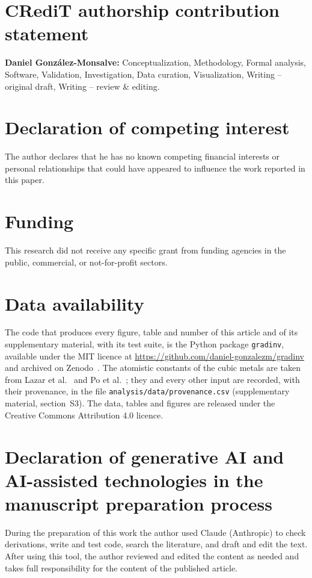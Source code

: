 
\section*{CRediT authorship contribution statement}

\textbf{Daniel Gonz\'alez-Monsalve:} Conceptualization, Methodology, Formal analysis,
Software, Validation, Investigation, Data curation, Visualization, Writing -- original draft,
Writing -- review \& editing.

\section*{Declaration of competing interest}

The author declares that he has no known competing financial interests or personal
relationships that could have appeared to influence the work reported in this paper.

\section*{Funding}

This research did not receive any specific grant from funding agencies in the public,
commercial, or not-for-profit sectors.

\section*{Data availability}

The code that produces every figure, table and number of this article and of its
supplementary material, with its test suite, is the Python package \texttt{gradinv},
available under the MIT licence at \url{https://github.com/daniel-gonzalezm/gradinv} and
archived on Zenodo~\cite{GonzalezMonsalve2026gradinv}. The atomistic constants of the cubic
metals are taken from Lazar et al.~\cite{Lazar2022} and Po et al.~\cite{Po2019}; they and
every other input are recorded, with their provenance, in the file
\texttt{analysis/data/provenance.csv} (supplementary material, section~S3). The data,
tables and figures are released under the Creative Commons Attribution 4.0 licence.

\section*{Declaration of generative AI and AI-assisted technologies in the manuscript preparation process}

During the preparation of this work the author used Claude (Anthropic) to check
derivations, write and test code, search the literature, and draft and edit the text. After
using this tool, the author reviewed and edited the content as needed and takes full
responsibility for the content of the published article.
